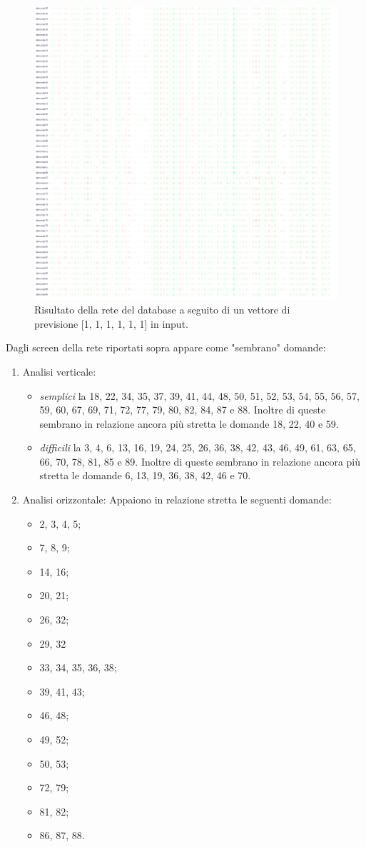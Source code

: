 \begin{itemize}
\begin{figure}[H]
\centering
	\includegraphics[width=0.90\linewidth]{./image/rete_db-vp1_2.png}
	\caption{Risultato della rete del database a seguito di un vettore di previsione [1, 1, 1, 1, 1, 1] in input.}
\end{figure}
\noindent
Dagli screen della rete riportati sopra appare come "sembrano" domande:
\begin{enumerate}
\item Analisi verticale:
\begin{itemize}
\item \textit{semplici} la 18, 22, 34, 35, 37, 39, 41, 44, 48, 50, 51, 52, 53, 54, 55, 56, 57, 59, 60, 67, 69,  71, 72, 77, 79, 80, 82, 84, 87 e 88. Inoltre di queste sembrano in relazione ancora pi\`u stretta le domande 18, 22, 40 e 59.
\item \textit{difficili} la 3, 4, 6, 13, 16, 19, 24, 25, 26, 36, 38, 42, 43, 46, 49, 61, 63, 65, 66, 70, 78, 81, 85 e 89. Inoltre di queste sembrano in relazione ancora pi\`u stretta le domande 6, 13, 19, 36, 38, 42, 46 e 70.
\end{itemize}
\item Analisi orizzontale:
Appaiono in relazione stretta le seguenti domande:
\begin{itemize}
\item 2, 3, 4, 5;
\item 7, 8, 9;
\item 14, 16;
\item 20, 21;
\item 26, 32;
\item 29, 32
\item 33, 34, 35, 36, 38;
\item 39, 41, 43;
\item 46, 48;
\item 49, 52;
\item 50, 53;
\item 72, 79;
\item 81, 82;
\item 86, 87, 88.
\end{itemize}
\end{enumerate}


\end{itemize}
